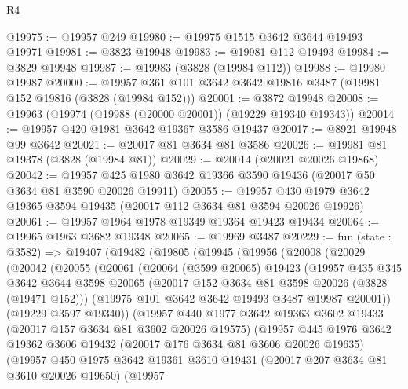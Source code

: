\begin{lexlean}{R4}
\begin{coremodule}
@19975 := @19957 @249
@19980 := @19975 @1515 @3642 @3644 @19493 @19971
@19981 := @3823 @19948
@19983 := @19981 @112 @19493
@19984 := @3829 @19948
@19987 := @19983 (@3828 (@19984 @112))
@19988 := @19980 @19987
@20000 := @19957 @361 @101 @3642 @3642 @19816 @3487 (@19981 @152 @19816 (@3828 (@19984 @152)))
@20001 := @3872 @19948
@20008 := @19963 (@19974 (@19988 (@20000 @20001)) (@19229 @19340 @19343))
@20014 := @19957 @420 @1981 @3642 @19367 @3586 @19437
@20017 := @8921 @19948 @99 @3642
@20021 := @20017 @81 @3634 @81 @3586
@20026 := @19981 @81 @19378 (@3828 (@19984 @81))
@20029 := @20014 (@20021 @20026 @19868)
@20042 := @19957 @425 @1980 @3642 @19366 @3590 @19436 (@20017 @50 @3634 @81 @3590 @20026 @19911)
@20055 := @19957 @430 @1979 @3642 @19365 @3594 @19435 (@20017 @112 @3634 @81 @3594 @20026 @19926)
@20061 := @19957 @1964 @1978 @19349 @19364 @19423 @19434
@20064 := @19965 @1963 @3682 @19348
@20065 := @19969 @3487
@20229 := fun (state : @3582) =>
  @19407
    (@19482
      (@19805
        (@19945
          (@19956
            (@20008
              (@20029
                (@20042
                  (@20055
                    (@20061
                      (@20064
                        (@3599 @20065)
                        @19423
                        (@19957
                          @435
                          @345
                          @3642
                          @3644
                          @3598
                          @20065
                          (@20017 @152 @3634 @81 @3598 @20026 (@3828 (@19471 @152)))
                          (@19975 @101 @3642 @3642 @19493 @3487 @19987 @20001))
                        (@19229 @3597 @19340))
                      (@19957
                        @440
                        @1977
                        @3642
                        @19363
                        @3602
                        @19433
                        (@20017 @157 @3634 @81 @3602 @20026 @19575)
                        (@19957
                          @445
                          @1976
                          @3642
                          @19362
                          @3606
                          @19432
                          (@20017 @176 @3634 @81 @3606 @20026 @19635)
                          (@19957
                            @450
                            @1975
                            @3642
                            @19361
                            @3610
                            @19431
                            (@20017 @207 @3634 @81 @3610 @20026 @19650)
                            (@19957

\end{coremodule}
\end{lexlean}
